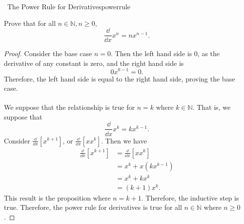     \begin{exercise}{\Difficulty\,\Difficulty\,\,The Power Rule for Derivatives}{powerrule}
    
        Prove that for all \(n\in\mathbb{N}, n \geq 0\),
        \begin{equation*}
            \frac{\dd}{\dd x}x^n=nx^{n-1}.
        \end{equation*}
        \begin{proof}
            Consider the base case \(n=0\). Then the left hand side is \(0\), as the derivative of any constant is zero, and the right hand side is
            \begin{equation*}
                0x^{0-1}=0.
            \end{equation*}
            Therefore, the left hand side is equal to the right hand side, proving the base case.
            \\
            \\
            We suppose that the relationship is true for \(n=k\) where \(k\in\mathbb{N}\). That is, we suppose that
            \begin{equation*}
                \frac{\dd}{\dd x}x^k=kx^{k-1}.
            \end{equation*}
            Consider \(\frac{\dd}{\dd x}[x^{k+1}]\), or \(\frac{\dd}{\dd x}[xx^{k}]\). Then we have
            \begin{align*}
                \frac{\dd}{\dd x}[x^{k+1}]&=\frac{\dd}{\dd x}[xx^k] \\
                &=x^k+x(kx^{k-1}) \\
                &=x^k+kx^k \\
                &=(k+1)x^k.
            \end{align*}
            This result is the proposition where \(n=k+1\). Therefore, the inductive step is true. Therefore, the power rule for derivatives is true for all \(n\in\mathbb{N}\) where \(n \geq 0\).
        \end{proof}
    
    \end{exercise}
    \pagebreak
